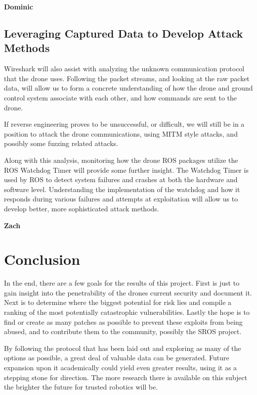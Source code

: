 \documentclass[IEEEtran,letterpaper,10pt,notitlepage,draftclsnofoot,onecolumn]{article}
\begin{document}
\textbf{Dominic}

\subsection{Leveraging Captured Data to Develop Attack Methods}
Wireshark will also assist with analyzing the unknown communication protocol that the drone uses. Following the packet
streams, and looking at the raw packet data, will allow us to form a concrete understanding of how the drone and
ground control system associate with each other, and how commands are sent to the drone\cite{UknProto}.

If reverse engineering proves to be unsuccessful, or difficult, we will still be in a position to attack the drone
communications, using MITM style attacks, and possibly some fuzzing related attacks\cite{Fuzzy}.

Along with this analysis, monitoring how the drone ROS packages utilize the ROS Watchdog Timer will provide some
further insight. The Watchdog Timer is used by ROS to detect system failures and crashes at both the hardware and
software level\cite{doggo_watching}. Understanding the implementation of the watchdog and how it responds
during various failures and attempts at exploitation will allow us to develop better, more sophisticated attack
methods.

\textbf{Zach}

\section{Conclusion}
In the end, there are a few goals for the results of this project.
First is just to gain insight into the penetrability of the drones current security and document it.
Next is to determine where the biggest potential for risk lies and compile a ranking of the most potentially catastrophic vulnerabilities.
Lastly the hope is to find or create as many patches as possible to prevent these exploits from being abused, and to contribute them to the community, possibly the SROS project.

By following the protocol that has been laid out and exploring as many of the options as possible, a great deal of valuable data can be generated.
Future expansion upon it academically could yield even greater results, using it as a stepping stone for direction.
The more research there is available on this subject the brighter the future for trusted robotics will be.



\end{document}
